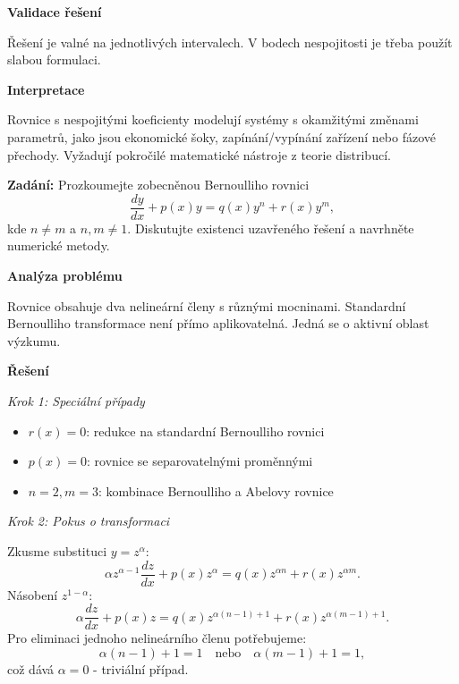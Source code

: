 \begin{example}
\noindent\textbf{Validace řešení}

Řešení je valné na jednotlivých intervalech. V bodech nespojitosti je třeba 
použít slabou formulaci.

\vspace{1.5\baselineskip}

\noindent\textbf{Interpretace}

Rovnice s nespojitými koeficienty modelují systémy s okamžitými změnami parametrů, 
jako jsou ekonomické šoky, zapínání/vypínání zařízení nebo fázové přechody. 
Vyžadují pokročilé matematické nástroje z teorie distribucí.

\end{example}

\vspace{2\baselineskip}

\begin{example}
\label{ex:e2-vyzkumne-problemy}

\noindent\textbf{Zadání:} Prozkoumejte zobecněnou Bernoulliho rovnici
\[
\frac{dy}{dx} + p(x)y = q(x)y^n + r(x)y^m,
\]
kde $n \neq m$ a $n, m \neq 1$. Diskutujte existenci uzavřeného řešení a navrhněte 
numerické metody.

\vspace{1.5\baselineskip}

\noindent\textbf{Analýza problému}

\noindent Rovnice obsahuje dva nelineární členy s různými mocninami. Standardní 
Bernoulliho transformace není přímo aplikovatelná. Jedná se o aktivní oblast výzkumu.

\vspace{1.5\baselineskip}

\noindent\textbf{Řešení}

\noindent\textit{Krok 1: Speciální případy}

\begin{itemize}
\item $r(x) = 0$: redukce na standardní Bernoulliho rovnici
\item $p(x) = 0$: rovnice se separovatelnými proměnnými
\item $n = 2, m = 3$: kombinace Bernoulliho a Abelovy rovnice
\end{itemize}

\noindent\textit{Krok 2: Pokus o transformaci}

Zkusme substituci $y = z^\alpha$:
\[
\alpha z^{\alpha-1} \frac{dz}{dx} + p(x)z^\alpha = q(x)z^{\alpha n} + r(x)z^{\alpha m}.
\]
Násobení $z^{1-\alpha}$:
\[
\alpha \frac{dz}{dx} + p(x)z = q(x)z^{\alpha(n-1)+1} + r(x)z^{\alpha(m-1)+1}.
\]
Pro eliminaci jednoho nelineárního členu potřebujeme:
\[
\alpha(n-1) + 1 = 1 \quad \text{nebo} \quad \alpha(m-1) + 1 = 1,
\]
což dává $\alpha = 0$ - triviální případ.


\end{example}
